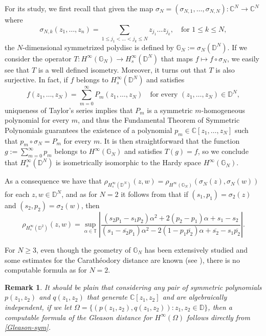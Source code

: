 \documentclass[preprint,12pt,number]{elsarticle}
\newtheorem{remark}[theorem]{Remark}
\newcommand{\C}{\mathbb{C}}
\newcommand{\D}{\mathbb{D}}
\newcommand{\T}{\mathbb{T}}
\newcommand{\G}{\mathbb{G}}
\begin{document}
For its study, we first recall that given the map $\sigma_N=(\sigma_{N,1},\ldots,\sigma_{N,N}):\C^N\rightarrow\C^N$ where 
\[
\sigma_{N,k}(z_1,\ldots,z_n)=\sum_{1\leq j_1<\ldots<j_k\leq N}z_{j_1}\ldots z_{j_k}, \quad \text{for } 1\leq k\leq N,
\] 
the $N$-dimensional symmetrized polydisc is defined by $\G_N:=\sigma_N(\D^N)$. If we consider the operator $T:H^\infty(\G_N)\rightarrow H^\infty_s(\D^N)$ that maps $f\mapsto f\circ\sigma_N$, we easily see that $T$ is a well defined isometry. Moreover, it turns out that $T$ is also surjective. In fact, if $f$ belongs to $H^\infty_s(\D^N)$ and satisfies 
\[
f(z_1,\ldots,z_N)=\sum_{m=0}^\infty P_m(z_1,\ldots,z_N)\quad \text{for every } (z_1,\ldots,z_N)\in\D^N,
\]
uniqueness of Taylor's series implies that $P_m$ is a symmetric $m$-homogeneous polynomial for every $m$, and thus the Fundamental Theorem of Symmetric Polynomials guarantees the existence of a polynomial $p_m\in \C[z_1,\ldots,z_N]$ such that $p_m\circ \sigma_N=P_m$ for every $m$. It is then straightforward that the function $g:=\sum_{m=0}^\infty p_m$ belongs to $H^\infty(\G_N)$ and satisfies $T(g)=f$, so we conclude that $H^\infty_s(\D^N)$ is isometrically isomorphic to the Hardy space $H^\infty(\G_N)$.

As a consequence we have that $\rho_{H^\infty_s(\D^N)}(z,w)=\rho_{H^\infty(\G_N)}(\sigma_N(z),\sigma_N(w))$ for each $z,w\in \D^N$, and as for $N=2$ it follows from \cite{AglerYoung2004} that if $(s_1,p_1)=\sigma_2(z)$ and $(s_2,p_2)=\sigma_2(w)$, then 
\begin{equation}\label{Gleason-sym}
    \rho_{H^\infty_s(\D^2)}(z,w)=\sup_{\alpha\in\T}\left|\frac{(s_2p_1-s_1p_2)\alpha^2+2(p_2-p_1)\alpha+s_1-s_2}{(s_1-\overline{s_2}p_1)\alpha^2-2(1-p_1\overline{p_2})\alpha+\overline{s_2}-s_1\overline{p_2}}\right|.
\end{equation} 

For $N\geq3$, even though the geometry of $\G_N$ has been extensively studied and some estimates for the Carathéodory distance are known (see \cite{NikolovPflugThomasZwonek2008}), there is no computable formula as for $N=2$. 
\begin{remark}
It should be plain that considering any pair of symmetric polynomials $p(z_1,z_2)$ and $q(z_1,z_2)$ that generate $\C[z_1,z_2]$ and are algebraically independent, if we let $\Omega=\{(p(z_1,z_2),q(z_1,z_2)): z_1,z_2\in\D\}$, then a computable formula of the Gleason distance for $H^\infty(\Omega)$ follows directly from \eqref{Gleason-sym}.
\end{remark}
\vspace{0.3cm}
\end{document}
